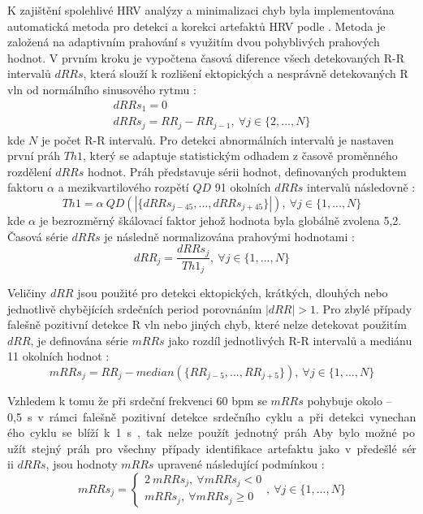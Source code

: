 K zajištění spolehlivé HRV analýzy a minimalizaci chyb byla implementována
automatická metoda pro detekci a korekci artefaktů HRV podle
\cite{Lipponen2019}. Metoda je založená na adaptivním prahování s využitím dvou
pohyblivých prahových hodnot. V prvním kroku je vypočtena časová diference všech
detekovaných R-R intervalů $dRRs$, která slouží k rozlišení ektopických a
nesprávně detekovaných R vln od normálního sinusového rytmu \cite{Lipponen2019}:
\begin{gather}
    dRRs_1 = 0 \nonumber \\
    dRRs_j = RR_j - RR_{j-1}, ~\forall j \in \{2,...,N\}
\end{gather}
kde $N$ je počet R-R intervalů. Pro detekci abnormálních intervalů je nastaven
první práh $Th1$, který se adaptuje statistickým odhadem z časově proměnného
rozdělení $dRRs$ hodnot. Práh představuje sérii hodnot, definovaných produktem
faktoru $\alpha$ a mezikvartilového rozpětí $QD$ 91 okolních $dRRs$ intervalů
následovně \cite{Lipponen2019}:
\begin{equation}
    Th1 = \alpha~QD(|\{dRRs_{j-45},...,dRRs_{j+45}\}|), ~\forall j \in \{1,...,N\}
\end{equation}
kde $\alpha$ je bezrozměrný škálovací faktor jehož hodnota byla globálně zvolena
5,2. Časová série $dRRs$ je následně normalizována prahovými hodnotami
\cite{Lipponen2019}:
\begin{equation}
    dRR_j = \frac{dRRs_j}{Th1_j}, ~\forall j \in \{1,...,N\}
\end{equation}

Veličiny $dRR$ jsou použité pro detekci ektopických, krátkých, dlouhých nebo
jednotlivě chybějících srdečních period porovnáním $|dRR|>1$. Pro zbylé případy
falešně pozitivní detekce R vln nebo jiných chyb, které nelze detekovat použitím
$dRR$, je definována série $mRRs$ jako rozdíl jednotlivých R-R intervalů a
mediánu 11 okolních hodnot \cite{Lipponen2019}:
\begin{equation}
    mRRs_j = RR_j - median(\{RR_{j-5},...,RR_{j+5}\}), ~\forall j \in \{1,...,N\}
\end{equation}

Vzhledem k tomu že při srdeční frekvenci 60 bpm se $mRRs$ pohybuje okolo
--0,5~\si\s~v rámci falešně pozitivní detekce srdečního cyklu a při detekci
vynechaného cyklu se blíží k 1~\si\s, tak nelze použít jednotný práh. Aby bylo
možné použít stejný práh pro všechny případy identifikace artefaktu jako v
předešlé sérii $dRRs$, jsou hodnoty $mRRs$ upravené následující podmínkou
\cite{Lipponen2019}:
\begin{equation}
    mRRs_j =
    \begin{cases}
        2~mRRs_j, ~\forall mRRs_j < 0 \\
        mRRs_j, ~\forall mRRs_j \geq 0
    \end{cases}
    , ~\forall j \in \{1,...,N\}
\end{equation}

